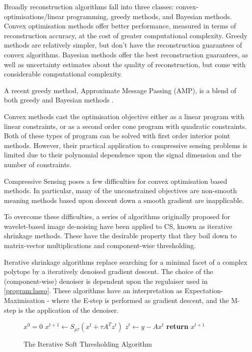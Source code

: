 \documentclass[12pt]{report}
\begin{document}

Broadly reconstruction algorithms fall into three classes: convex-optimisations/linear programming, greedy methods, and Bayesian methods. Convex optimisation methods offer better performance, measured in terms of reconstruction accuracy, at the cost of greater computational complexity. Greedy methods are relatively simpler, but don't have the reconstruction guarantees of convex algorithms. Bayesian methods offer the best reconstruction guarantees, as well as uncertainty estimates about the quality of reconstruction, but come with considerable computational complexity.

A recent greedy method, Approximate Message Passing (AMP), is a blend of both greedy and Bayesian methods \cite{donoho2009message}.

Convex methods cast the optimisation objective either as a linear program with linear constraints, or as a second order cone program with quadratic constraints. Both of these types of program can be solved with first order interior point methods. However, their practical application to compressive sensing problems is limited due to their polynomial dependence upon the signal dimension and the number of constraints. 

Compressive Sensing poses a few difficulties for convex optimisation based methods. In particular, many of the unconstrained objectives are non-smooth meaning methods based upon descent down a smooth gradient are inapplicable. 

To overcome these difficulties, a series of algorithms originally proposed for wavelet-based image de-noising have been applied to CS, known as iterative shrinkage methods. These have the desirable property that they boil down to matrix-vector multiplications and component-wise thresholding.

Iterative shrinkage algorithms replace searching for a minimal facet of a complex polytope by a iteratively denoised gradient descent. The choice of the (component-wise) denoiser is dependent upon the regulaiser used in \ref{program:lasso}. These algorithms have an interpretation as Expectation-Maximisation \cite{figueiredo2003algorithm} - where the E-step is performed as gradient descent, and the M-step is the application of the denoiser.

\begin{figure}
\begin{algorithmic}[1]
\State $x^0 = 0$
\State $x^{t+1} \gets S_{\mu\tau}\left(x^t + \tau A^Tz^t \right) $
\State $z^t \gets y - Ax^t$
\EndWhile
\State \textbf{return} $x^{t+1}$
\EndProcedure
\end{algorithmic}
\caption{The Iterative Soft Thresholding Algorithm}\label{alg:IST}
\end{figure}
\end{document}

